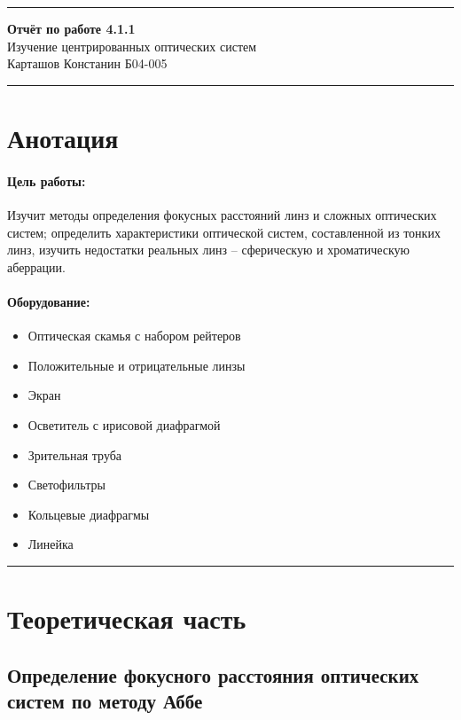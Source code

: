 \documentclass[a4paper,12pt]{article} %
\begin{document}


\hrule 	
\medskip
\begin{raggedright}
{\large \textbf{Отчёт по работе 4.1.1}}
\\
\medskip
{\Large Изучение центрированных оптических систем} 
\\
\medskip
{\large Карташов Констанин Б04-005}
\medskip
\hrule
\medskip
\end{raggedright}


\section{Анотация}

\paragraph{Цель работы:} 
Изучит методы определения фокусных расстояний линз и сложных оптических систем; определить характеристики оптической систем, составленной из тонких линз, изучить недостатки реальных линз -- сферическую и хроматическую аберрации.

\paragraph{Оборудование:}
\begin{itemize}
\renewcommand{\labelitemi}{$\triangleright$}
\itemsep0em
\item Оптическая скамья с набором рейтеров
\item Положительные и отрицательные линзы
\item Экран
\item Осветитель с ирисовой диафрагмой
\item Зрительная труба 
\item Светофильтры
\item Кольцевые диафрагмы
\item Линейка
\end{itemize}


\medskip\hrule\medskip

\section{Теоретическая часть}

\subsection{Определение фокусного расстояния оптических систем по методу Аббе}
\end{document}
